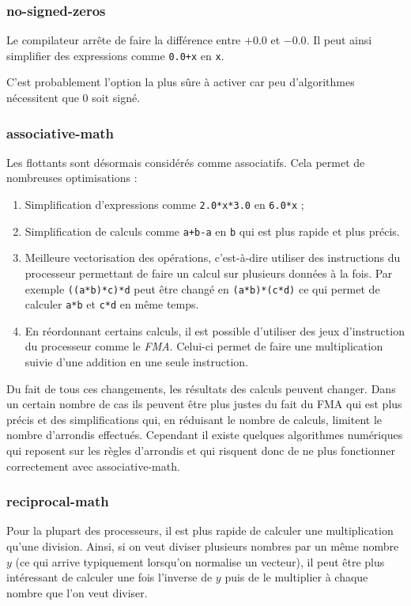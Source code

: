 \documentclass[a4paper,11pt]{report}
\begin{document}
\subsubsection{no-signed-zeros}
Le compilateur arrête de faire la différence entre $+0.0$ et $-0.0$.
Il peut ainsi simplifier des expressions comme \verb'0.0+x' en \verb'x'.

C'est probablement l'option la plus sûre à activer car peu d'algorithmes nécessitent que $0$ soit signé.

\subsubsection{associative-math}
Les flottants sont désormais considérés comme associatifs.
Cela permet de nombreuses optimisations :
\begin{enumerate}
    \item Simplification d'expressions comme \verb'2.0*x*3.0' en \verb'6.0*x' ;
    \item Simplification de calculs comme \verb'a+b-a' en \verb'b' qui est plus rapide et plus précis.
    \item Meilleure vectorisation des opérations, c'est-à-dire utiliser des instructions du processeur permettant de faire un calcul sur plusieurs données à la fois.
          Par exemple \verb'((a*b)*c)*d' peut être changé en \verb'(a*b)*(c*d)' ce qui permet de calculer \verb'a*b' et \verb'c*d' en même temps.
    \item En réordonnant certains calculs, il est possible d'utiliser des jeux d'instruction du processeur comme le \emph{FMA}.
          Celui-ci permet de faire une multiplication suivie d'une addition en une seule instruction.
\end{enumerate}

Du fait de tous ces changements, les résultats des calculs peuvent changer.
Dans un certain nombre de cas ils peuvent être plus justes du fait du FMA qui est plus précis et des simplifications qui, en réduisant le nombre de calculs, limitent le nombre d'arrondis effectués.
Cependant il existe quelques algorithmes numériques qui reposent sur les règles d'arrondis et qui risquent donc de ne plus fonctionner correctement avec associative-math.

\subsubsection{reciprocal-math}
Pour la plupart des processeurs, il est plus rapide de calculer une multiplication qu'une division.
Ainsi, si on veut diviser plusieurs nombres par un même nombre $y$ (ce qui arrive typiquement lorsqu'on normalise un vecteur), il peut être plus intéressant de calculer une fois l'inverse de $y$ puis de le multiplier à chaque nombre que l'on veut diviser.
\end{document}
